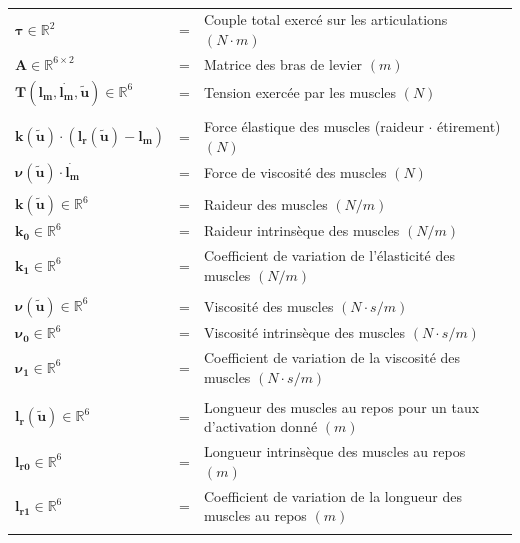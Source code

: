 \documentclass[pdftex,a4paper,11pt]{report}
\newcommand{\vs}[1]{\boldsymbol{#1}} %
\newcommand{\ms}[1]{\boldsymbol{#1}} %
\numberwithin{equation}{subsection}
\begin{document}
\paragraph{}
\begin{small}
\begin{tabular}{lcl}
    $\vs{\tau} \in \mathbb{R}^2$              & = & Couple total exercé sur les articulations $(N \cdot m)$ \\
    $\ms{A} \in \mathbb{R}^{6 \times 2}$      & = & Matrice des bras de levier $(m)$ \\
    $\vs{T}(\vs{l_m}, \vs{\dot{l_m}}, \vs{\tilde{u}}) \in \mathbb{R}^6$  & = & Tension exercée par les muscles $(N)$ \\
    \\
    $\vs{k}(\vs{\tilde{u}}) \cdot (\vs{l_r}(\vs{\tilde{u}}) - \vs{l_m})$ & = & Force élastique des muscles (raideur $\cdot$ étirement) $(N)$ \\
    $\vs{\nu}(\vs{\tilde{u}}) \cdot \vs{\dot{l_m}}$ & = & Force de viscosité des muscles $(N)$ \\
    \\

    $\vs{k}(\vs{\tilde{u}}) \in \mathbb{R}^6$      & = & Raideur des muscles $(N/m)$ \\
    $\vs{k_0} \in \mathbb{R}^6$               & = & Raideur intrinsèque des muscles $(N/m)$ \\
    $\vs{k_1} \in \mathbb{R}^6$               & = & Coefficient de variation de l'élasticité des muscles $(N/m)$ \\
    \\

    $\vs{\nu}(\vs{\tilde{u}}) \in \mathbb{R}^6$    & = & Viscosité des muscles $(N \cdot s/m)$ \\
    $\vs{\nu_0} \in \mathbb{R}^6$             & = & Viscosité intrinsèque des muscles $(N \cdot s/m)$ \\
    $\vs{\nu_1} \in \mathbb{R}^6$             & = & Coefficient de variation de la viscosité des muscles $(N \cdot s/m)$ \\
    \\

    $\vs{l_r}(\vs{\tilde{u}}) \in \mathbb{R}^6$    & = & Longueur des muscles au repos pour un taux d'activation donné $(m)$ \\
    $\vs{l_{r0}} \in \mathbb{R}^6$            & = & Longueur intrinsèque des muscles au repos $(m)$ \\
    $\vs{l_{r1}} \in \mathbb{R}^6$            & = & Coefficient de variation de la longueur des muscles au repos $(m)$ \\
    \\


\end{tabular}
\end{small}
\end{document}
